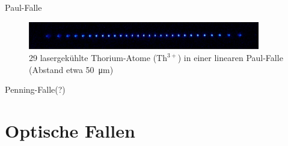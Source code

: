 \documentclass[12pt]{beamer}
\begin{document}
\begin{frame}{Paul-Falle}
\begin{figure}[h]
	\centering
	\includegraphics[width=0.9\textwidth]{./figures/29_laser_cooled_ion_chain.jpg}
	\caption{29 lasergekühlte Thorium-Atome ($\mathrm{Th}^{3+}$) in einer linearen Paul-Falle (Abstand etwa \SI{50}{\micro\metre}) \cite{campbell}}
\end{figure}

\end{frame}

\begin{frame}{Penning-Falle(?)}
\end{frame}


\section{Optische Fallen}
\end{document}
